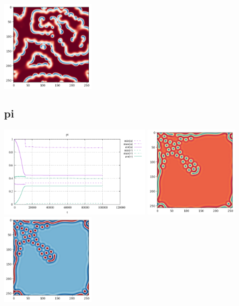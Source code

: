 \begin{center}
\includegraphics[height=4.5cm]{python_codes/fieldstone_171/results/xi2_solution_final_v.png}
\end{center}

\subsection*{pi}
\begin{center}
\includegraphics[height=4.5cm]{python_codes/fieldstone_171/results/pi_stats}
\includegraphics[height=4.5cm]{python_codes/fieldstone_171/results/pi_solution_final_u.png}
\includegraphics[height=4.5cm]{python_codes/fieldstone_171/results/pi_solution_final_v.png}
\end{center}

